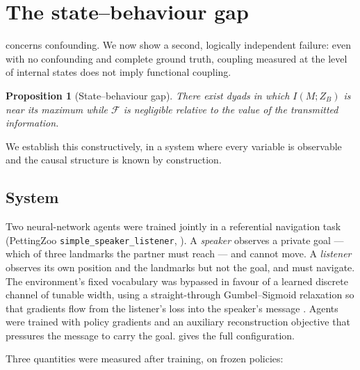 \documentclass[11pt,a4paper]{article}
\theoremstyle{plain}
\newtheorem{proposition}[proposition]{Proposition}
\theoremstyle{definition}
\theoremstyle{remark}
\newcommand{\Fc}{\mathcal{F}}
\newcommand{\code}[1]{\texttt{\small #1}}
\begin{document}
\section{The state--behaviour gap}\label{sec:empirical}

 concerns confounding. We now show a second, logically independent failure: even
with no confounding and complete ground truth, coupling measured at the level of internal states
does not imply functional coupling.

\begin{proposition}[State--behaviour gap]\label{prop:gap}
There exist dyads in which $I(M; Z_B)$ is near its maximum while $\Fc$ is negligible relative to
the value of the transmitted information.
\end{proposition}

We establish this constructively, in a system where every variable is observable and the causal
structure is known by construction.

\subsection{System}\label{sec:system}

Two neural-network agents were trained jointly in a referential navigation task (PettingZoo
\code{simple\_speaker\_listener}, \citealp{terry2021pettingzoo}). A \emph{speaker} observes a
private goal --- which of three landmarks the partner must reach --- and cannot move. A
\emph{listener} observes its own position and the landmarks but not the goal, and must navigate.
The environment's fixed vocabulary was bypassed in favour of a learned discrete channel of
tunable width, using a straight-through Gumbel--Sigmoid relaxation so that gradients flow from
the listener's loss into the speaker's message \citep{jang2016categorical, foerster2016learning}.
Agents were trained with policy gradients and an auxiliary reconstruction objective that pressures
the message to carry the goal.  gives the full configuration.

Three quantities were measured after training, on frozen policies:
\end{document}
